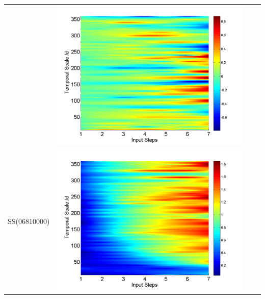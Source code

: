\documentclass[review]{elsarticle}
\begin{document}
\begin{table}[H]
\begin{tabular}{cccc}
&\begin{minipage}{.3\textwidth}\includegraphics[width=\linewidth]{resultgraph/11532500diff_q.png}\end{minipage}
\\
SS(06810000)
&\begin{minipage}{.3\textwidth}\includegraphics[width=\linewidth]{resultgraph/06810000p.png}\end{minipage}

\end{tabular}
\end{table}
\end{document}

